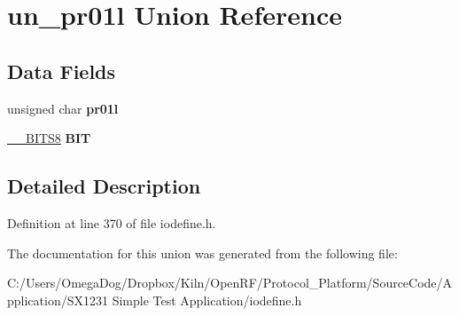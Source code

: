 \hypertarget{unionun__pr01l}{\section{un\-\_\-pr01l Union Reference}
\label{unionun__pr01l}
}
\subsection*{Data Fields}
\begin{DoxyCompactItemize}
\item 
\hypertarget{unionun__pr01l_ac69c3afb637ad998b880c8c3c1911373}{unsigned char {\bfseries pr01l}}\label{unionun__pr01l_ac69c3afb637ad998b880c8c3c1911373}

\item 
\hypertarget{unionun__pr01l_a556ee6285437401715d76e84968f83b9}{\hyperlink{struct_____b_i_t_s8}{\-\_\-\-\_\-\-B\-I\-T\-S8} {\bfseries B\-I\-T}}\label{unionun__pr01l_a556ee6285437401715d76e84968f83b9}

\end{DoxyCompactItemize}


\subsection{Detailed Description}


Definition at line 370 of file iodefine.\-h.



The documentation for this union was generated from the following file\-:\begin{DoxyCompactItemize}
\item 
C\-:/\-Users/\-Omega\-Dog/\-Dropbox/\-Kiln/\-Open\-R\-F/\-Protocol\-\_\-\-Platform/\-Source\-Code/\-Application/\-S\-X1231 Simple Test Application/iodefine.\-h\end{DoxyCompactItemize}

